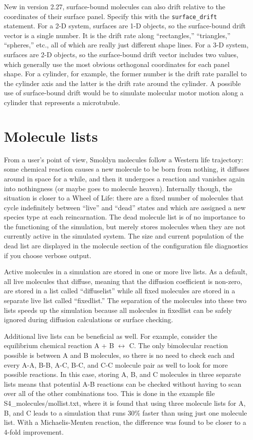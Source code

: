 \documentclass {book}
\newcommand {\ttt} {\texttt}
\begin{document}
New in version 2.27, surface-bound molecules can also drift relative to the coordinates of their surface panel. Specify this with the \ttt{surface\_drift} statement. For a 2-D system, surfaces are 1-D objects, so the surface-bound drift vector is a single number. It is the drift rate along ``rectangles,'' ``triangles,'' ``spheres,'' etc., all of which are really just different shape lines. For a 3-D system, surfaces are 2-D objects, so the surface-bound drift vector includes two values, which generally use the most obvious orthogonal coordinates for each panel shape. For a cylinder, for example, the former number is the drift rate parallel to the cylinder axis and the latter is the drift rate around the cylinder. A possible use of surface-bound drift would be to simulate molecular motor motion along a cylinder that represents a microtubule.

\section{Molecule lists}

From a user's point of view, Smoldyn molecules follow a Western life trajectory: some chemical reaction causes a new molecule to be born from nothing, it diffuses around in space for a while, and then it undergoes a reaction and vanishes again into nothingness (or maybe goes to molecule heaven). Internally though, the situation is closer to a Wheel of Life: there are a fixed number of molecules that cycle indefinitely between ``live'' and ``dead'' states and which are assigned a new species type at each reincarnation. The dead molecule list is of no importance to the functioning of the simulation, but merely stores molecules when they are not currently active in the simulated system. The size and current population of the dead list are displayed in the molecule section of the configuration file diagnostics if you choose verbose output.

Active molecules in a simulation are stored in one or more live lists. As a default, all live molecules that diffuse, meaning that the diffusion coefficient is non-zero, are stored in a list called ``diffuselist'' while all fixed molecules are stored in a separate live list called ``fixedlist.'' The separation of the molecules into these two lists speeds up the simulation because all molecules in fixedlist can be safely ignored during diffusion calculations or surface checking.

Additional live lists can be beneficial as well. For example, consider the equilibrium chemical reaction A + B $\leftrightarrow$ C. The only bimolecular reaction possible is between A and B molecules, so there is no need to check each and every A-A, B-B, A-C, B-C, and C-C molecule pair as well to look for more possible reactions. In this case, storing A, B, and C molecules in three separate lists means that potential A-B reactions can be checked without having to scan over all of the other combinations too. This is done in the example file S4\_molecules/mollist.txt, where it is found that using three molecule lists for A, B, and C leads to a simulation that runs 30\% faster than using just one molecule list. With a Michaelis-Menten reaction, the difference was found to be closer to a 4-fold improvement.
\end{document}
